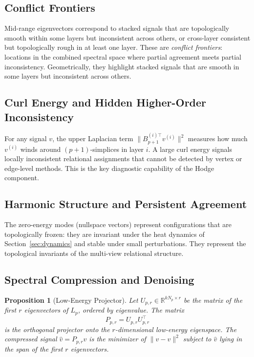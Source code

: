 \documentclass[11pt]{article}
\newtheorem{proposition}[theorem]{Proposition}
\theoremstyle{definition}
\theoremstyle{remark}
\newcommand{\R}{\mathbb{R}}
\newcommand{\Pp}{P_{p,r}}
\newcommand{\Up}{U_{p,r}}
\newcommand{\vhat}{\hat{v}}
\begin{document}
\subsection{Conflict Frontiers}

Mid-range eigenvectors correspond to stacked signals that are topologically
smooth within some layers but inconsistent across others, or cross-layer
consistent but topologically rough in at least one layer. These are
\emph{conflict frontiers}: locations in the combined spectral space where
partial agreement meets partial inconsistency. Geometrically, they highlight
stacked signals that are smooth in some layers but inconsistent across others.

\subsection{Curl Energy and Hidden Higher-Order Inconsistency}

For any signal $v$, the upper Laplacian term $\|B_{p+1}^{(i)\top}v^{(i)}\|^2$
measures how much $v^{(i)}$ winds around $(p+1)$-simplices in layer $i$. A
large curl energy signals locally inconsistent relational assignments that
cannot be detected by vertex or edge-level methods. This is the key diagnostic
capability of the Hodge component.

\subsection{Harmonic Structure and Persistent Agreement}

The zero-energy modes (nullspace vectors) represent configurations that are
topologically frozen: they are invariant under the heat dynamics of
Section~\ref{sec:dynamics} and stable under small perturbations. They represent
the topological invariants of the multi-view relational structure.

\subsection{Spectral Compression and Denoising}

\begin{proposition}[Low-Energy Projector]
\label{prop:compression}
Let $\Up\in\R^{kN_p\times r}$ be the matrix of the first $r$ eigenvectors of
$L_p$, ordered by eigenvalue. The matrix
\[
  \Pp = \Up\Up^\top
\]
is the orthogonal projector onto the $r$-dimensional low-energy eigenspace.
The compressed signal $\vhat = \Pp v$ is the minimizer of
$\|\vhat - v\|^2$ subject to $\vhat$ lying in the span of the first $r$
eigenvectors.
\end{proposition}
\end{document}

